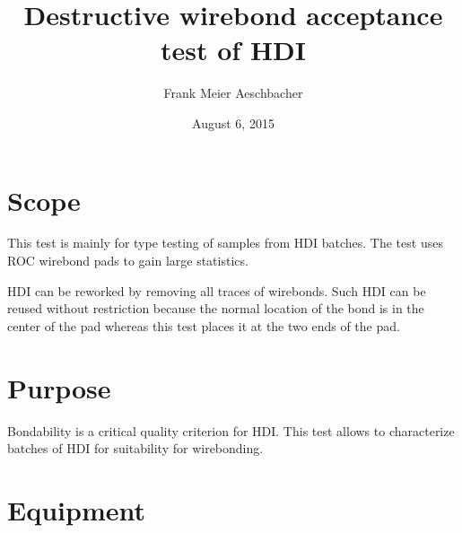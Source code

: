 \documentclass[10pt]{unlsilabsop}
\title{Destructive wirebond acceptance test of HDI}
\date{August 6, 2015}
\author{Frank Meier Aeschbacher}
\begin{document}
\maketitle

\section{Scope}
This test is mainly for type testing of samples from HDI batches. The test uses ROC wirebond pads to gain large statistics.

HDI can be reworked by removing all traces of wirebonds. Such HDI can be reused without restriction because the normal location of the bond is in the center of the pad whereas this test places it at the two ends of the pad.

\section{Purpose}
Bondability is a critical quality criterion for HDI. This test allows to characterize batches of HDI for suitability for wirebonding.



\section{Equipment}
\end{document}
